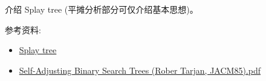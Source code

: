 \documentclass[a4paper, justified]{tufte-handout}
\begin{document}
\begin{solution}
\end{solution}

\begin{problem}[TC 13.3-5]
\end{problem}

\begin{solution}
\end{solution}

\begin{problem}[TC 13.4-1]
\end{problem}

\begin{solution}
\end{solution}

\begin{problem}[TC 13.4-7]
\end{problem}

\begin{solution}
\end{solution}

\beginoptional

\begin{problem}
\end{problem}

\begin{solution}
\end{solution}

\beginot

\begin{ot}
  介绍 Splay tree (平摊分析部分可仅介绍基本思想)。

  \noindent 参考资料:
  \begin{itemize}
    \item \href{https://en.wikipedia.org/wiki/Splay\_tree}{Splay tree}
    \item \href{https://www.cs.princeton.edu/courses/archive/spring06/cos423/Handouts/self\%20adjusting.pdf}{Self-Adjusting Binary Search Trees (Rober Tarjan, JACM85).pdf}
  \end{itemize}
\end{ot}

% 
\end{document}
